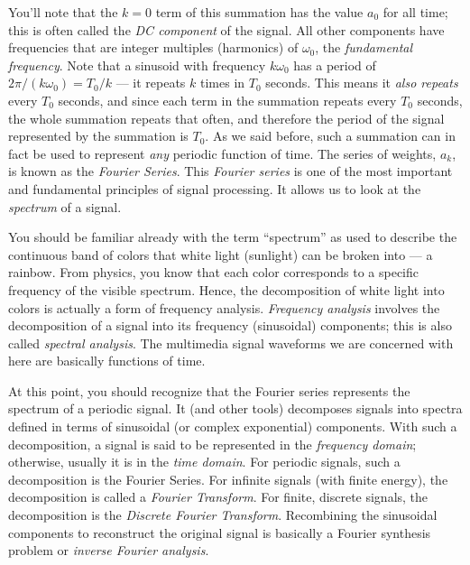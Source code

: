 You'll note that the $k=0$ term of this summation has the value $a_0$
for all time; this is often called the \emph{DC component} of the
signal. All other components have frequencies that are integer
multiples (harmonics) of $\omega_0$, the \emph{fundamental
frequency}. Note that a sinusoid with frequency $k\omega_0$ has a
period of $2\pi/(k\omega_0) = T_0/k$ --- it repeats $k$ times in $T_0$
seconds. This means it \emph{also repeats} every $T_0$ seconds, and since
each term in the summation repeats every $T_0$ seconds, the whole
summation repeats that often, and therefore the period of the signal
represented by the summation is $T_0$. As we said before, such
a summation can in fact be used to represent \emph{any} periodic
function of time. The series of weights, $a_k$, is known as the \emph{Fourier Series}. This \emph{Fourier series} is one of the most
important and fundamental principles of signal processing. It allows us to look at the \emph{spectrum} of a signal.

You should be familiar already with the term ``spectrum'' as used to
describe the continuous band of colors that white light (sunlight) can
be broken into --- a rainbow. From physics, you know that each color
corresponds to a specific frequency of the visible spectrum. Hence,
the decomposition of white light into colors is actually a form of
frequency analysis. \emph{Frequency analysis} involves the
decomposition of a signal into its frequency (sinusoidal) components;
this is also called \emph{spectral analysis}. The multimedia signal
waveforms we are concerned with here are basically functions of
time.

At this point, you should recognize that the Fourier series represents
the spectrum of a periodic signal.  It (and other tools) decomposes
signals into spectra defined in terms of sinusoidal (or complex
exponential) components. With such a decomposition, a signal is said
to be represented in the
\emph{frequency domain}; otherwise, usually it is in the \emph{time
domain}. For periodic signals, such a decomposition is the Fourier
Series. For infinite signals (with finite energy), the decomposition
is called a \emph{Fourier Transform}. For finite, discrete signals,
the decomposition is the \emph{Discrete Fourier Transform}.
Recombining the sinusoidal components to reconstruct the original
signal is basically a Fourier synthesis problem or
\emph{inverse Fourier analysis}. 

